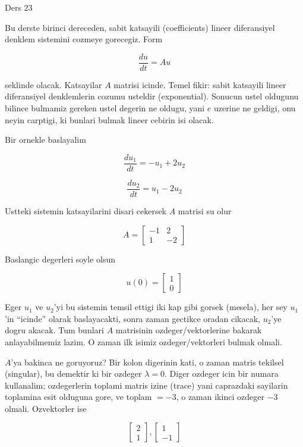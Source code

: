 \documentclass[12pt,fleqn]{article}\usepackage{../common}
\begin{document}
Ders 23

Bu derste birinci dereceden, sabit katsayili (coefficients) lineer
diferansiyel denklem sistemini cozmeye gorecegiz. Form

\[ \frac{du}{dt} = A u \]

seklinde olacak. Katsayilar $A$ matrisi icinde. Temel fikir: sabit katsayili
lineer diferansiyel denklemlerin cozumu usteldir (exponential). Sonucun
ustel oldugunu bilince bulmamiz gereken ustel degerin ne oldugu, yani $e$
uzerine ne geldigi, onu neyin carptigi, ki bunlari bulmak lineer cebirin
isi olacak.

Bir ornekle baslayalim

\[ \frac{du_1}{dt} = -u_1 + 2u_2 \]

\[ \frac{du_2}{dt} = u_1 - 2u_2 \]

Ustteki sistemin katsayilarini disari cekersek $A$ matrisi su olur

\[ A = 
\left[\begin{array}{cc}
-1 & 2 \\
1 & -2
\end{array}\right]
 \]

Baslangic degerleri soyle olsun

\[ u(0) = 
\left[\begin{array}{c}
1 \\
0
\end{array}\right]
 \]

Eger $u_1$ ve $u_2$'yi bu sistemin temsil ettigi iki kap gibi gorsek
(mesela), her sey $u_1$'in ``icinde'' olarak baslayacakti, sonra zaman
gectikce oradan cikacak, $u_2$'ye dogru akacak. Tum bunlari $A$ matrisinin
ozdeger/vektorlerine bakarak anlayabilmemiz lazim. O zaman ilk isimiz
ozdeger/vektorleri bulmak olmali. 

$A$'ya bakinca ne goruyoruz? Bir kolon digerinin kati, o zaman matris
tekilsel (singular), bu demektir ki bir ozdeger $\lambda = 0$. Diger
ozdeger icin bir numara kullanalim; ozdegerlerin toplami matris izine
(trace) yani caprazdaki sayilarin toplamina esit olduguna gore, ve toplam
$=-3$, o zaman ikinci ozdeger $-3$ olmali. Ozvektorler ise

\[ 
\left[\begin{array}{c}
2 \\ 1
\end{array}\right] 
,
\left[\begin{array}{c}
1 \\ -1
\end{array}\right]
 \]
\end{document}
